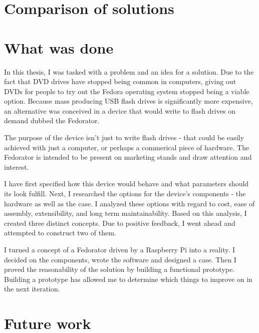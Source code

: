 \label{Conclusion}
    \section{Comparison of solutions}
        \todo{}
        
    \section{What was done}
        In this thesis, I was tasked with a problem and an idea for a solution.  Due to the fact that DVD drives have stopped being common in computers, giving out DVDs for people to try out the Fedora operating system stopped being a viable option.  Because mass producing USB flash drives is significantly more expensive, an alternative was conceived in a device that would write to flash drives on demand dubbed the Fedorator.
        
        The purpose of the device isn't just to write flash drives - that could be easily achieved with just a computer, or perhaps a commerical piece of hardware.  The Fedorator is intended to be present on marketing stands and draw attention and interest.
        
        I have first specified how this device would behave and what parameters should its look fulfill.  Next, I researched the options for the device's components - the hardware as well as the case.  I analyzed these options with regard to cost, ease of assembly, extensibility, and long term maintainability.  Based on this analysis, I created three distinct concepts.  Due to positive feedback, I went ahead and attempted to construct two of them.
        
        I turned a concept of a Fedorator driven by a Raspberry Pi into a reality.  I decided on the components, wrote the software and designed a case.  Then I proved the reasonability of the solution by building a functional prototype.  Building a prototype has allowed me to determine which things to improve on in the next iteration.
        

        
        
    \section{Future work}
        
